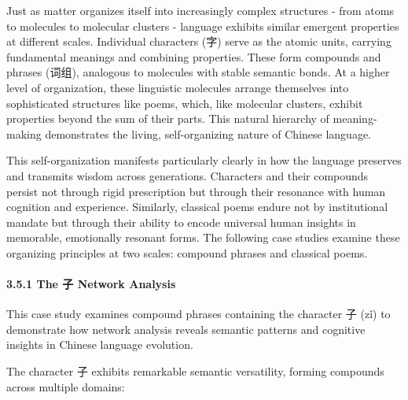 \documentclass[
  11pt,
  letterpaper,
]{article}
\begin{document}
Just as matter organizes itself into increasingly complex structures -
from atoms to molecules to molecular clusters - language exhibits
similar emergent properties at different scales. Individual characters
(字) serve as the atomic units, carrying fundamental meanings and
combining properties. These form compounds and phrases (词组), analogous
to molecules with stable semantic bonds. At a higher level of
organization, these linguistic molecules arrange themselves into
sophisticated structures like poems, which, like molecular clusters,
exhibit properties beyond the sum of their parts. This natural hierarchy
of meaning-making demonstrates the living, self-organizing nature of
Chinese language.

This self-organization manifests particularly clearly in how the
language preserves and transmits wisdom across generations. Characters
and their compounds persist not through rigid prescription but through
their resonance with human cognition and experience. Similarly,
classical poems endure not by institutional mandate but through their
ability to encode universal human insights in memorable, emotionally
resonant forms. The following case studies examine these organizing
principles at two scales: compound phrases and classical poems.

\hypertarget{the-ux5b50-network-analysis}{%
\paragraph{3.5.1 The 子 Network
Analysis}\label{the-ux5b50-network-analysis}}

This case study examines compound phrases containing the character 子
(zǐ) to demonstrate how network analysis reveals semantic patterns and
cognitive insights in Chinese language evolution.

The character 子 exhibits remarkable semantic versatility, forming
compounds across multiple domains:
\end{document}

